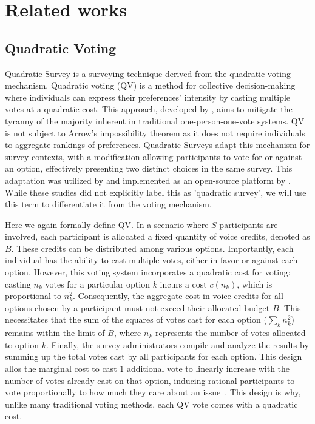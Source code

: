 \section{Related works}
\subsection{Quadratic Voting}
Quadratic Survey is a surveying technique derived from the quadratic voting mechanism. Quadratic voting (QV) is a method for collective decision-making where individuals can express their preferences' intensity by casting multiple votes at a quadratic cost. This approach, developed by \textcite{posner2018radical, lalley2018quadratic}, aims to mitigate the tyranny of the majority inherent in traditional one-person-one-vote systems. QV is not subject to Arrow's impossibility theorem as it does not require individuals to aggregate rankings of preferences. Quadratic Surveys adapt this mechanism for survey contexts, with a modification allowing participants to vote for or against an option, effectively presenting two distinct choices in the same survey. This adaptation was utilized by \textcite{quarfoot2017quadratic} and implemented as an open-source platform by \textcite{bassettiCivicbaseOpensourcePlatform2023}. While these studies did not explicitly label this as 'quadratic survey', we will use this term to differentiate it from the voting mechanism.

Here we again formally define QV. In a scenario where $S$ participants are involved, each participant is allocated a fixed quantity of voice credits, denoted as $B$. These credits can be distributed among various options. Importantly, each individual has the ability to cast multiple votes, either in favor or against each option. However, this voting system incorporates a quadratic cost for voting: casting $n_k$ votes for a particular option $k$ incurs a cost $c(n_k)$, which is proportional to $n_k^2$. Consequently, the aggregate cost in voice credits for all options chosen by a participant must not exceed their allocated budget $B$. This necessitates that the sum of the squares of votes cast for each option ($\sum_k n_k^2$) remains within the limit of $B$, where $n_k$ represents the number of votes allocated to option $k$. Finally, the survey administrators compile and analyze the results by summing up the total votes cast by all participants for each option. This design allos the marginal cost to cast $1$ additional vote to linearly increase with the number of votes already cast on that option, inducing rational participants to vote proportionally to how much they care about an issue~\cite{posner2018radical}. This design is why, unlike many traditional voting methods, each QV vote comes with a quadratic cost.

